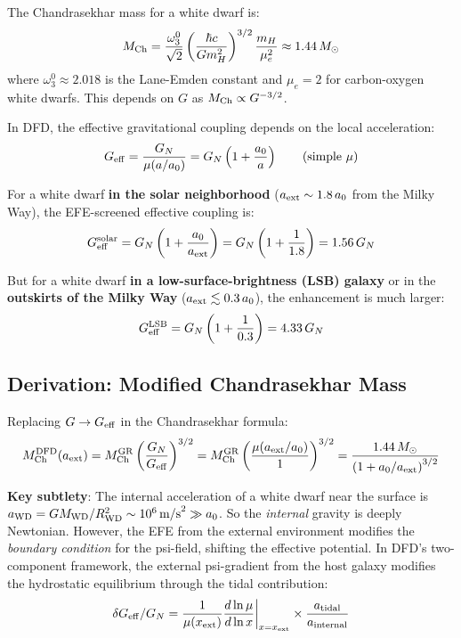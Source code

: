 \documentclass[11pt]{article}
\begin{document}
The Chandrasekhar mass for a white dwarf is:
\begin{equation}
M_{\rm Ch} = \frac{\omega_3^0}{\sqrt{2}}\left(\frac{\hbar c}{G m_H^2}\right)^{3/2}
\frac{m_H}{\mu_e^2} \approx 1.44\,M_\odot
\end{equation}
where $\omega_3^0 \approx 2.018$ is the Lane-Emden constant and $\mu_e = 2$
for carbon-oxygen white dwarfs. This depends on $G$ as $M_{\rm Ch} \propto G^{-3/2}$.

In DFD, the effective gravitational coupling depends on the local acceleration:
\begin{equation}
G_{\rm eff} = \frac{G_N}{\mu(a/a_0)} = G_N\left(1 + \frac{a_0}{a}\right)
\qquad\text{(simple } \mu\text{)}
\end{equation}

For a white dwarf \textbf{in the solar neighborhood} ($a_{\rm ext} \sim 1.8\,a_0$
from the Milky Way), the EFE-screened effective coupling is:
\begin{equation}
G_{\rm eff}^{\rm solar} = G_N\left(1 + \frac{a_0}{a_{\rm ext}}\right)
= G_N\left(1 + \frac{1}{1.8}\right) = 1.56\,G_N
\end{equation}

But for a white dwarf \textbf{in a low-surface-brightness (LSB) galaxy} or
in the \textbf{outskirts of the Milky Way} ($a_{\rm ext} \lesssim 0.3\,a_0$),
the enhancement is much larger:
\begin{equation}
G_{\rm eff}^{\rm LSB} = G_N\left(1 + \frac{1}{0.3}\right) = 4.33\,G_N
\end{equation}

\subsection{Derivation: Modified Chandrasekhar Mass}

Replacing $G \to G_{\rm eff}$ in the Chandrasekhar formula:
\begin{equation}
M_{\rm Ch}^{\rm DFD}(a_{\rm ext}) = M_{\rm Ch}^{\rm GR}\left(\frac{G_N}{G_{\rm eff}}\right)^{3/2}
= M_{\rm Ch}^{\rm GR}\left(\frac{\mu(a_{\rm ext}/a_0)}{1}\right)^{3/2}
= \frac{1.44\,M_\odot}{\left(1 + a_0/a_{\rm ext}\right)^{3/2}}
\end{equation}

\textbf{Key subtlety}: The internal acceleration of a white dwarf near the
surface is $a_{\rm WD} = GM_{\rm WD}/R_{\rm WD}^2 \sim 10^6\,\text{m/s}^2
\gg a_0$. So the \emph{internal} gravity is deeply Newtonian. However, the
EFE from the external environment modifies the \emph{boundary condition}
for the psi-field, shifting the effective potential. In DFD's two-component
framework, the external psi-gradient from the host galaxy modifies the
hydrostatic equilibrium through the tidal contribution:
\begin{equation}
\delta G_{\rm eff}/G_N = \frac{1}{\mu(x_{\rm ext})}\frac{d\ln\mu}{d\ln x}\bigg|_{x=x_{\rm ext}}
\times \frac{a_{\rm tidal}}{a_{\rm internal}}
\end{equation}
\end{document}
